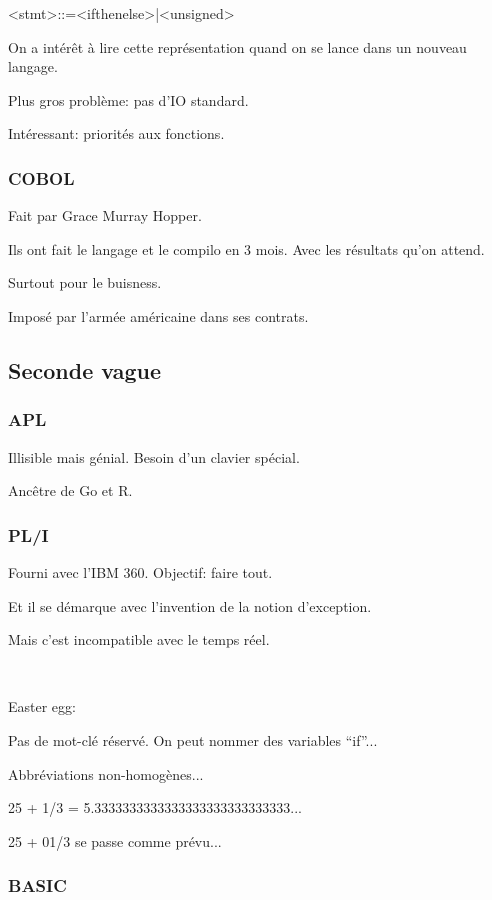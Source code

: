 \documentclass[a4paper,11pt]{article}
\begin{document}
<stmt>::=<ifthenelse>|<unsigned>

On a intérêt à lire cette représentation quand on se lance dans un nouveau
langage.

Plus gros problème: pas d'IO standard.

Intéressant: priorités aux fonctions.

\subsubsection{COBOL}

Fait par Grace Murray Hopper.

Ils ont fait le langage et le compilo en 3 mois. Avec les résultats qu'on
attend.

Surtout pour le buisness.

Imposé par l'armée américaine dans ses contrats.

\subsection{Seconde vague}

\subsubsection{APL}

Illisible mais génial. Besoin d'un clavier spécial.

Ancêtre de Go et R.

\subsubsection{PL/I}

Fourni avec l'IBM 360. Objectif: faire tout.

Et il se démarque avec l'invention de la notion d'exception.

Mais c'est incompatible avec le temps réel.

\

Easter egg:

Pas de mot-clé réservé. On peut nommer des variables ``if''...

Abbréviations non-homogènes...

25 + 1/3 = 5.3333333333333333333333333333...

25 + 01/3 se passe comme prévu...

\subsubsection{BASIC}
\end{document}
